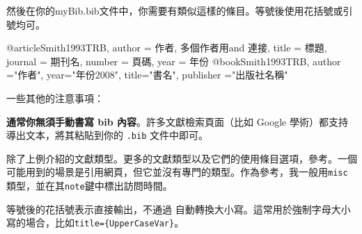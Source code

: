然後在你的myBib.bib文件中，你需要有類似這樣的條目。等號後使用花括號或引號均可。
\begin{latex}
@article{Smith1993TRB,
    author = {作者, 多個作者用and 連接},
    title = {標題},
    journal = {期刊名},
    number = {頁碼},
    year = {年份}}
@book{Smith1993TRB,
    author ="作者",
    year="年份2008",
    title="書名",
    publisher ="出版社名稱"}
\end{latex}

一些其他的注意事項：
\begin{feai}
  \item \textbf{通常你無須手動書寫 bib 內容}。許多文獻檢索頁面（比如 Google 學術）都支持導出\bibtex 文本，將其粘貼到你的 \texttt{.bib} 文件中即可。
  \item 除了上例介紹的文獻類型。更多的文獻類型以及它們的使用條目選項，參考。一個可能用到的場景是引用網頁，但它並沒有專門的類型。作為參考，我一般用\texttt{misc}類型，並在其\texttt{note}鍵中標出訪問時間。
  \item 等號後的花括號表示直接輸出，不通過 \bibtex 自動轉換大小寫。這常用於強制字母大小寫的場合，比如\texttt{title=\{UpperCaseVar\}}。
\end{feai}

